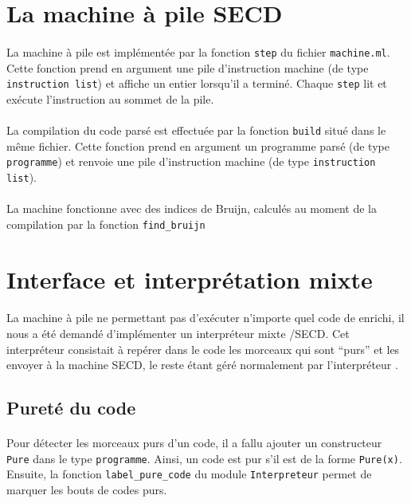 \section{La machine à pile SECD} %

\paragraph{} La machine à pile est implémentée par la fonction \texttt{step} du fichier \texttt{machine.ml}. Cette fonction prend en argument une pile d'instruction machine (de type \texttt{instruction list}) et affiche un entier lorsqu'il a terminé. Chaque \texttt{step} lit et exécute l'instruction au sommet de la pile.

\paragraph{} La compilation du code parsé est effectuée par la fonction \texttt{build} situé dans le même fichier. Cette fonction prend en argument un programme \fouine parsé (de type \texttt{programme}) et renvoie une pile d'instruction machine (de type \texttt{instruction list}).

\paragraph{} La machine fonctionne avec des indices de Bruijn, calculés au moment de la compilation par la fonction \texttt{find\_bruijn}


\section{Interface et interprétation mixte}

\paragraph{}La machine à pile ne permettant pas d'exécuter n'importe quel code de \fouine enrichi, il nous a été demandé d'implémenter un interpréteur mixte \fouine/SECD. Cet interpréteur consistait à repérer dans le code les morceaux qui sont ``purs'' et les envoyer à la machine SECD, le reste étant géré normalement par l'interpréteur \fouine.

\subsection{Pureté du code}
\paragraph{}Pour détecter les morceaux purs d'un code, il a fallu ajouter un constructeur \texttt{Pure} dans le type \texttt{programme}. Ainsi, un code est pur s'il est de la forme \texttt{Pure(x)}. \\
Ensuite, la fonction \texttt{label\_pure\_code} du module \texttt{Interpreteur} permet de marquer les bouts de codes purs.
